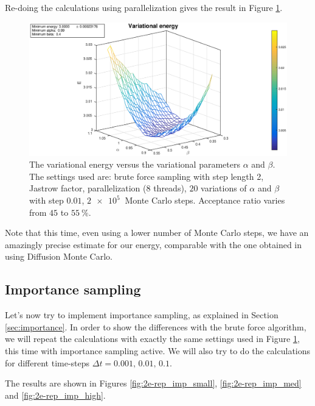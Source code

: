 \documentclass[a4paper,twoside,11pt]{book}
\begin{document}
Re-doing the calculations using parallelization gives the result in Figure \ref{fig:2e_rep_parallel}.
\begin{figure}[H]
	\centering
	\includegraphics[width=\textwidth]{2e-rep_parallel}
	\caption{The variational energy versus the variational parameters $\alpha$ and $\beta$. The settings used are: brute force sampling with step length 2, Jastrow factor, parallelization (8 threads), $20$ variations of $\alpha$ and $\beta$ with step $0.01$, $\SI{2e5}{}$ Monte Carlo steps. Acceptance ratio varies from $45$ to $\SI{55}{\percent}$.}
	\label{fig:2e_rep_parallel}
\end{figure}
Note that this time, even using a lower number of Monte Carlo steps, we have an amazingly precise estimate for our energy, comparable with the one obtained in \cite{pede} using Diffusion Monte Carlo.

\subsection{Importance sampling}
Let's now try to implement importance sampling, as explained in Section \ref{sec:importance}. In order to show the differences with the brute force algorithm, we will repeat the calculations with exactly the same settings used in Figure \ref{fig:2e_rep_parallel}, this time with importance sampling active. We will also try to do the calculations for different time-steps $\Delta t = 0.001,\,0.01,\,0.1$.

The results are shown in Figures \ref{fig:2e-rep_imp_small}, \ref{fig:2e-rep_imp_med} and \ref{fig:2e-rep_imp_high}.
\end{document}
